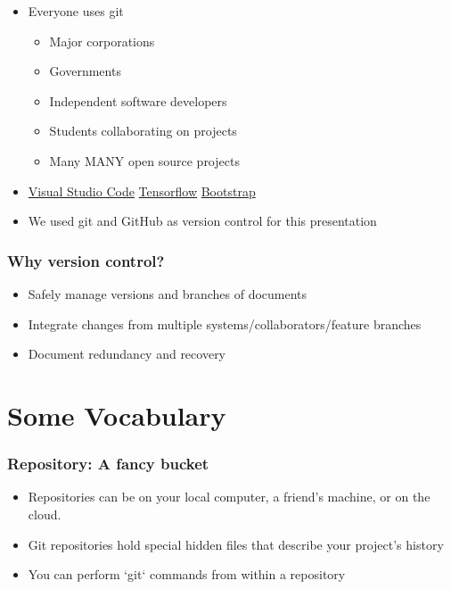 \documentclass[unknownkeysallowed]{beamer}
\begin{document}
\begin{frame}
\begin{figure}
\begin{center}
                \end{center}
            \endminipage
        \end{figure}
    \begin{itemize}
        \item{Everyone uses git}
            \begin{itemize}
                \item{Major corporations}
                \item{Governments}
                \item{Independent software developers}
                \item{Students collaborating on projects}
                \item{Many MANY open source projects}
           \end{itemize}
   \item{\href{https://github.com/Microsoft/vscode}{Visual Studio Code} \hfill \href{https://github.com/tensorflow/tensorflow}{Tensorflow} \hfill \href{https://github.com/twbs/bootstrap}{Bootstrap}}
        \item{We used git and GitHub as version control for this presentation}
    \end{itemize}
\end{frame}

\begin{frame}
	\frametitle{Why version control?}
	\begin{itemize}
		\item{Safely manage versions and branches of documents}
		\item{Integrate changes from multiple systems/collaborators/feature branches}
		\item{Document redundancy and recovery}
	\end{itemize}
\end{frame}


\section{Some Vocabulary}
\begin{frame}
	\frametitle{Repository: A fancy bucket}
	\begin{itemize}
	    \item{Repositories can be on your local computer, a friend's machine, or on the cloud.}
        \vspace{0.5cm}
	    \item{Git repositories hold special hidden files that describe your project's history}
        \vspace{0.5cm}
	    \item{You can perform `git` commands from within a repository}
	\end{itemize}
\end{frame}
\end{document}
